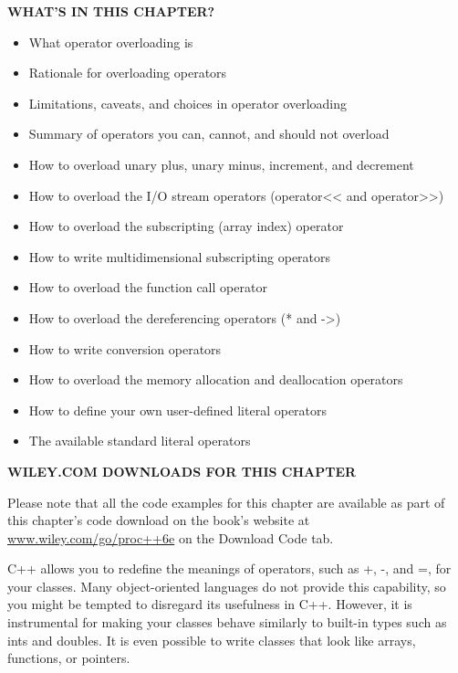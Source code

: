 \noindent
\textbf{WHAT’S IN THIS CHAPTER?}

\begin{itemize}
\item
What operator overloading is

\item
Rationale for overloading operators

\item
Limitations, caveats, and choices in operator overloading

\item
Summary of operators you can, cannot, and should not overload

\item
How to overload unary plus, unary minus, increment, and decrement

\item
How to overload the I/O stream operators (operator<{}< and operator>{}>)

\item
How to overload the subscripting (array index) operator

\item
How to write multidimensional subscripting operators

\item
How to overload the function call operator

\item
How to overload the dereferencing operators (* and ->)

\item
How to write conversion operators

\item
How to overload the memory allocation and deallocation operators

\item
How to define your own user-defined literal operators

\item
The available standard literal operators
\end{itemize}

\noindent
\textbf{WILEY.COM DOWNLOADS FOR THIS CHAPTER}

Please note that all the code examples for this chapter are available as part of this chapter’s code download on the book’s website at \url{www.wiley.com/go/proc++6e} on the Download Code tab.

C++ allows you to redefine the meanings of operators, such as +, -, and =, for your classes. Many object-oriented languages do not provide this capability, so you might be tempted to disregard its usefulness in C++. However, it is instrumental for making your classes behave similarly to built-in types such as ints and doubles. It is even possible to write classes that look like arrays, functions, or pointers.

